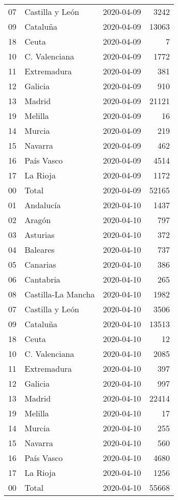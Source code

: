 \documentclass[
]{article}
\newenvironment{Shaded}{\begin{snugshade}}{\end{snugshade}}
\newcommand{\DataTypeTok}[1]{\textcolor[rgb]{0.13,0.29,0.53}{#1}}
\newcommand{\KeywordTok}[1]{\textcolor[rgb]{0.13,0.29,0.53}{\textbf{#1}}}
\newcommand{\NormalTok}[1]{#1}
\newcommand{\OperatorTok}[1]{\textcolor[rgb]{0.81,0.36,0.00}{\textbf{#1}}}
\newcommand{\StringTok}[1]{\textcolor[rgb]{0.31,0.60,0.02}{#1}}
\begin{document}
\begin{longtable}[]{@{}lllr@{}}
07 & Castilla y León & 2020-04-09 & 3242\tabularnewline
09 & Cataluña & 2020-04-09 & 13063\tabularnewline
18 & Ceuta & 2020-04-09 & 7\tabularnewline
10 & C. Valenciana & 2020-04-09 & 1772\tabularnewline
11 & Extremadura & 2020-04-09 & 381\tabularnewline
12 & Galicia & 2020-04-09 & 910\tabularnewline
13 & Madrid & 2020-04-09 & 21121\tabularnewline
19 & Melilla & 2020-04-09 & 16\tabularnewline
14 & Murcia & 2020-04-09 & 219\tabularnewline
15 & Navarra & 2020-04-09 & 462\tabularnewline
16 & País Vasco & 2020-04-09 & 4514\tabularnewline
17 & La Rioja & 2020-04-09 & 1172\tabularnewline
00 & Total & 2020-04-09 & 52165\tabularnewline
01 & Andalucía & 2020-04-10 & 1437\tabularnewline
02 & Aragón & 2020-04-10 & 797\tabularnewline
03 & Asturias & 2020-04-10 & 372\tabularnewline
04 & Baleares & 2020-04-10 & 737\tabularnewline
05 & Canarias & 2020-04-10 & 386\tabularnewline
06 & Cantabria & 2020-04-10 & 265\tabularnewline
08 & Castilla-La Mancha & 2020-04-10 & 1982\tabularnewline
07 & Castilla y León & 2020-04-10 & 3506\tabularnewline
09 & Cataluña & 2020-04-10 & 13513\tabularnewline
18 & Ceuta & 2020-04-10 & 12\tabularnewline
10 & C. Valenciana & 2020-04-10 & 2085\tabularnewline
11 & Extremadura & 2020-04-10 & 397\tabularnewline
12 & Galicia & 2020-04-10 & 997\tabularnewline
13 & Madrid & 2020-04-10 & 22414\tabularnewline
19 & Melilla & 2020-04-10 & 17\tabularnewline
14 & Murcia & 2020-04-10 & 255\tabularnewline
15 & Navarra & 2020-04-10 & 560\tabularnewline
16 & País Vasco & 2020-04-10 & 4680\tabularnewline
17 & La Rioja & 2020-04-10 & 1256\tabularnewline
00 & Total & 2020-04-10 & 55668\tabularnewline
\bottomrule
\end{longtable}

\begin{Shaded}
\end{Shaded}
\end{document}
